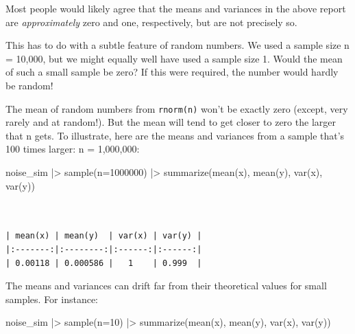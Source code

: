 \documentclass[
  letterpaper,
  DIV=11,
  numbers=noendperiod,
  oneside]{scrartcl}
\newenvironment{Shaded}{\begin{snugshade}}{\end{snugshade}}
\newcommand{\AttributeTok}[1]{\textcolor[rgb]{0.40,0.45,0.13}{#1}}
\newcommand{\DecValTok}[1]{\textcolor[rgb]{0.68,0.00,0.00}{#1}}
\newcommand{\FunctionTok}[1]{\textcolor[rgb]{0.28,0.35,0.67}{#1}}
\newcommand{\NormalTok}[1]{\textcolor[rgb]{0.00,0.23,0.31}{#1}}
\newcommand{\SpecialCharTok}[1]{\textcolor[rgb]{0.37,0.37,0.37}{#1}}
\begin{document}
\begin{tcolorbox}[enhanced jigsaw, colbacktitle=quarto-callout-note-color!10!white, opacityback=0, breakable, opacitybacktitle=0.6, colback=white, coltitle=black, arc=.35mm, title=\textcolor{quarto-callout-note-color}{\faInfo}\hspace{0.5em}{But they aren't exactly what they ought to be!}, left=2mm, colframe=quarto-callout-note-color-frame, rightrule=.15mm, bottomrule=.15mm, leftrule=.75mm, bottomtitle=1mm, toptitle=1mm, titlerule=0mm, toprule=.15mm]

Most people would likely agree that the means and variances in the above
report are \emph{approximately} zero and one, respectively, but are not
precisely so.

This has to do with a subtle feature of random numbers. We used a sample
size n = 10,000, but we might equally well have used a sample size 1.
Would the mean of such a small sample be zero? If this were required,
the number would hardly be random!

The mean of random numbers from \texttt{rnorm(n)} won't be exactly zero
(except, very rarely and at random!). But the mean will tend to get
closer to zero the larger that n gets. To illustrate, here are the means
and variances from a sample that's 100 times larger: n = 1,000,000:

\begin{Shaded}
\begin{Highlighting}[]
\NormalTok{noise\_sim }\SpecialCharTok{|\textgreater{}} \FunctionTok{sample}\NormalTok{(}\AttributeTok{n=}\DecValTok{1000000}\NormalTok{) }\SpecialCharTok{|\textgreater{}}
  \FunctionTok{summarize}\NormalTok{(}\FunctionTok{mean}\NormalTok{(x), }\FunctionTok{mean}\NormalTok{(y), }\FunctionTok{var}\NormalTok{(x), }\FunctionTok{var}\NormalTok{(y))}
\end{Highlighting}
\end{Shaded}

\begin{verbatim}


| mean(x) | mean(y)  | var(x) | var(y) |
|:-------:|:--------:|:------:|:------:|
| 0.00118 | 0.000586 |   1    | 0.999  |
\end{verbatim}

The means and variances can drift far from their theoretical values for
small samples. For instance:

\begin{Shaded}
\begin{Highlighting}[]
\NormalTok{noise\_sim }\SpecialCharTok{|\textgreater{}} \FunctionTok{sample}\NormalTok{(}\AttributeTok{n=}\DecValTok{10}\NormalTok{) }\SpecialCharTok{|\textgreater{}}
  \FunctionTok{summarize}\NormalTok{(}\FunctionTok{mean}\NormalTok{(x), }\FunctionTok{mean}\NormalTok{(y), }\FunctionTok{var}\NormalTok{(x), }\FunctionTok{var}\NormalTok{(y))}
\end{Highlighting}
\end{Shaded}


\end{tcolorbox}
\end{document}
